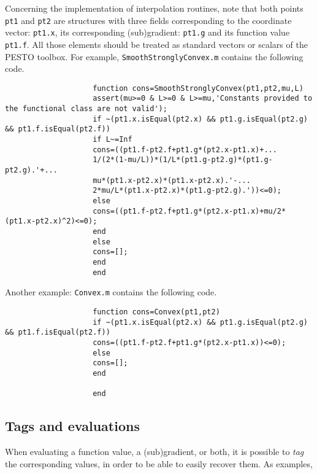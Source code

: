\documentclass[11pt,a4paper]{article}
\begin{document}
					Concerning the implementation of interpolation routines, note that both points \verb?pt1? and \verb?pt2? are structures with three fields corresponding to the coordinate vector: \verb?pt1.x?, its corresponding (sub)gradient: \verb?pt1.g? and its function value \verb?pt1.f?. All those elements should be treated as standard vectors or scalars of the PESTO toolbox. For example, \verb?SmoothStronglyConvex.m? contains the following code.\\[-1cm]

					\begin{lstlisting}
					function cons=SmoothStronglyConvex(pt1,pt2,mu,L)
					assert(mu>=0 & L>=0 & L>=mu,'Constants provided to the functional class are not valid');
					if ~(pt1.x.isEqual(pt2.x) && pt1.g.isEqual(pt2.g) && pt1.f.isEqual(pt2.f))
					if L~=Inf
					cons=((pt1.f-pt2.f+pt1.g*(pt2.x-pt1.x)+...
					1/(2*(1-mu/L))*(1/L*(pt1.g-pt2.g)*(pt1.g-pt2.g).'+...
					mu*(pt1.x-pt2.x)*(pt1.x-pt2.x).'-...
					2*mu/L*(pt1.x-pt2.x)*(pt1.g-pt2.g).'))<=0);
					else
					cons=((pt1.f-pt2.f+pt1.g*(pt2.x-pt1.x)+mu/2*(pt1.x-pt2.x)^2)<=0);
					end
					else
					cons=[];
					end
					end
					\end{lstlisting}
					\newpage
					Another example: \verb?Convex.m? contains the following code.\\[-1cm]
					\begin{lstlisting}
					function cons=Convex(pt1,pt2)
					if ~(pt1.x.isEqual(pt2.x) && pt1.g.isEqual(pt2.g) && pt1.f.isEqual(pt2.f))
					cons=((pt1.f-pt2.f+pt1.g*(pt2.x-pt1.x))<=0);
					else
					cons=[];
					end

					end
					\end{lstlisting}
					\newpage
					\subsection{Tags and evaluations}\label{sec:tags}
					When evaluating a function value, a (sub)gradient, or both, it is possible to \emph{tag} the corresponding values, in order to be able to easily recover them. As examples,
\end{document}
